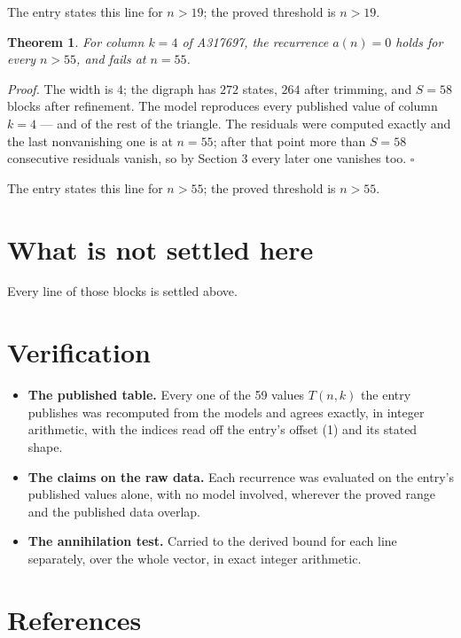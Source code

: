 \documentclass[11pt]{article}
\newtheorem{theorem}{Theorem}
\theoremstyle{definition}
\begin{document}
The entry states this line for $n > 19$; the proved threshold is $n > 19$.

\begin{theorem} For column $k = 4$ of A317697, the recurrence $a(n) = 0$ holds for every $n > 55$, and fails at $n = 55$.\end{theorem}

{\itshape Proof.} The width is $4$; the digraph has $272$ states, $264$ after trimming, and $S = 58$ blocks after refinement. The model reproduces every published value of column $k = 4$ --- and of the rest of the triangle. The residuals were computed exactly and the last nonvanishing one is at $n = 55$; after that point more than $S = 58$ consecutive residuals vanish, so by Section 3 every later one vanishes too. $\square$

The entry states this line for $n > 55$; the proved threshold is $n > 55$.

\section{What is not settled here}

Every line of those blocks is settled above.

\section{Verification}

\begin{itemize}

\item {\bfseries The published table.} Every one of the 59 values $T(n,k)$ the entry publishes was recomputed from the models and agrees exactly, in integer arithmetic, with the indices read off the entry's offset (1) and its stated shape.

\item {\bfseries The claims on the raw data.} Each recurrence was evaluated on the entry's published values alone, with no model involved, wherever the proved range and the published data overlap.

\item {\bfseries The annihilation test.} Carried to the derived bound for each line separately, over the whole vector, in exact integer arithmetic.

\end{itemize}

\section{References}
\end{document}
